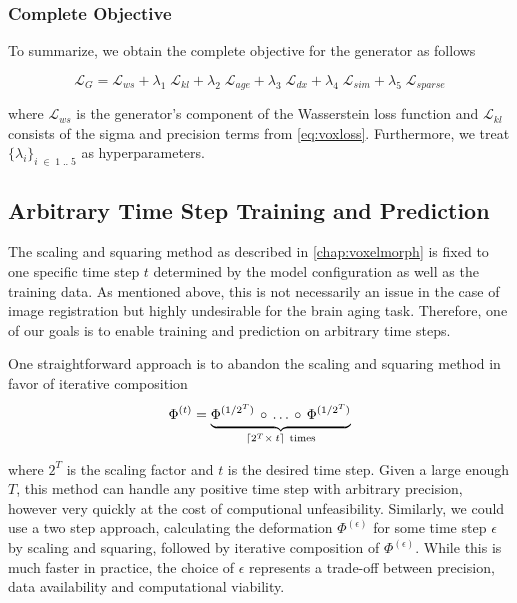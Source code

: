 \subsubsection*{Complete Objective}
To summarize, we obtain the complete objective for the generator as follows

\begin{equation}
	\mathcal{L}_G =
		\mathcal{L}_{ws} +
		\lambda_{1} \; \mathcal{L}_{kl} +
		\lambda_{2} \; \mathcal{L}_{age} + 
		\lambda_{3} \; \mathcal{L}_{dx} + 
		\lambda_{4} \; \mathcal{L}_{sim} + 
		\lambda_{5} \; \mathcal{L}_{sparse}
\end{equation}

where $\mathcal{L}_{ws}$ is the generator's component of the Wasserstein loss function and $\mathcal{L}_{kl}$ consists of the sigma and precision terms from \autoref{eq:voxloss}. Furthermore, we treat $ \{ \lambda_i \}_{i\;\in\;1\;..\;5}$ as hyperparameters.

\subsection{Arbitrary Time Step Training and Prediction} \label{sec:adaarbtimestep}
The scaling and squaring method as described in \autoref{chap:voxelmorph} is fixed to one specific time step $t$ determined by the model configuration as well as the training data. As mentioned above, this is not necessarily an issue in the case of image registration but highly undesirable for the brain aging task. Therefore, one of our goals is to enable training and prediction on arbitrary time steps.

One straightforward approach is to abandon the scaling and squaring method in favor of iterative composition
\begin{equation}
	\Phi^{(t)} =
	\underbrace{
		\Phi^{(1 / 2^T)} \, \circ \, \ldots \, \circ \, \Phi^{(1 / 2^T)} \vphantom{\Phi^{(1 / 2^T)}_2}
	}_{\lceil 2^T \times \: t \rceil \ \text{times}}
\end{equation}

where $2^T$ is the scaling factor and $t$ is the desired time step. Given a large enough $T$, this method can handle any positive time step with arbitrary precision, however very quickly at the cost of computional unfeasibility. Similarly, we could use a two step approach, calculating the deformation $\Phi^{(\epsilon)}$ for some time step $\epsilon$ by scaling and squaring, followed by iterative composition of $\Phi^{(\epsilon)}$. While this is much faster in practice, the choice of $\epsilon$ represents a trade-off between precision, data availability and computational viability.

